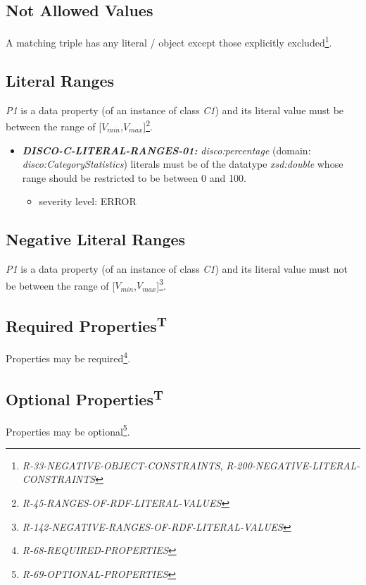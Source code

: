 \documentclass{llncs}
\begin{document}
\subsection{Not Allowed Values}

A matching triple has any literal / object except those explicitly excluded\footnote{\emph{R-33-NEGATIVE-OBJECT-CONSTRAINTS}, \emph{R-200-NEGATIVE-LITERAL-CONSTRAINTS}}.

\subsection{Literal Ranges}

\emph{P1} is a data property (of an instance of class \emph{C1}) and its literal value must be between the range of [$V_{min}$,$V_{max}$]\footnote{{\em R-45-RANGES-OF-RDF-LITERAL-VALUES}}.

\begin{itemize}
	\item \textbf{{\em DISCO-C-LITERAL-RANGES-01:}}
{\em disco:percentage} (domain: {\em disco:CategoryStatistics}) literals must be of the datatype {\em xsd:double} whose range should be restricted to be between 0 and 100.
	\begin{itemize}
		\item severity level: ERROR
	\end{itemize}
\end{itemize}

\subsection{Negative Literal Ranges}

\emph{P1} is a data property (of an instance of class \emph{C1}) and its literal value must not be between the range of [$V_{min}$,$V_{max}$]\footnote{{\em R-142-NEGATIVE-RANGES-OF-RDF-LITERAL-VALUES}}.

\subsection{Required Properties\textsuperscript{T}}

Properties may be required\footnote{\emph{R-68-REQUIRED-PROPERTIES}}.

\subsection{Optional Properties\textsuperscript{T}}

Properties may be optional\footnote{\emph{R-69-OPTIONAL-PROPERTIES}}.
\end{document}
